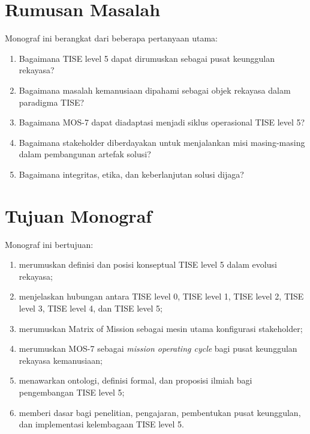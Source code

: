 \documentclass[
  letterpaper,
  DIV=11,
  numbers=noendperiod]{scrreprt}
\providecommand{\tightlist}{%
  \setlength{\itemsep}{0pt}\setlength{\parskip}{0pt}}
\begin{document}
\section*{Rumusan Masalah}\label{rumusan-masalah}


Monograf ini berangkat dari beberapa pertanyaan utama:

\begin{enumerate}
\def\labelenumi{\arabic{enumi}.}
\tightlist
\item
  Bagaimana TISE level 5 dapat dirumuskan sebagai pusat keunggulan
  rekayasa?
\item
  Bagaimana masalah kemanusiaan dipahami sebagai objek rekayasa dalam
  paradigma TISE?
\item
  Bagaimana MOS-7 dapat diadaptasi menjadi siklus operasional TISE level
  5?
\item
  Bagaimana stakeholder diberdayakan untuk menjalankan misi
  masing-masing dalam pembangunan artefak solusi?
\item
  Bagaimana integritas, etika, dan keberlanjutan solusi dijaga?
\end{enumerate}

\section*{Tujuan Monograf}\label{tujuan-monograf}


Monograf ini bertujuan:

\begin{enumerate}
\def\labelenumi{\arabic{enumi}.}
\tightlist
\item
  merumuskan definisi dan posisi konseptual TISE level 5 dalam evolusi
  rekayasa;
\item
  menjelaskan hubungan antara TISE level 0, TISE level 1, TISE level 2,
  TISE level 3, TISE level 4, dan TISE level 5;
\item
  merumuskan Matrix of Mission sebagai mesin utama konfigurasi
  stakeholder;
\item
  merumuskan MOS-7 sebagai \emph{mission operating cycle} bagi pusat
  keunggulan rekayasa kemanusiaan;
\item
  menawarkan ontologi, definisi formal, dan proposisi ilmiah bagi
  pengembangan TISE level 5;
\item
  memberi dasar bagi penelitian, pengajaran, pembentukan pusat
  keunggulan, dan implementasi kelembagaan TISE level 5.
\end{enumerate}
\end{document}
